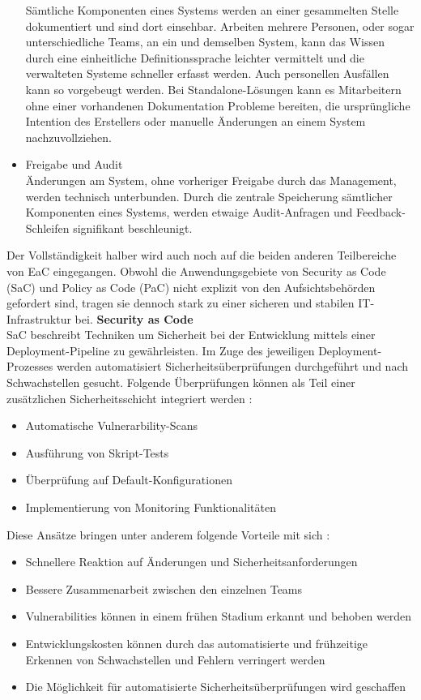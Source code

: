 \begin{itemize}
        Sämtliche Komponenten eines Systems werden an einer gesammelten Stelle dokumentiert und sind dort einsehbar. Arbeiten mehrere Personen, oder sogar unterschiedliche Teams, an ein und demselben System, kann das Wissen durch eine einheitliche Definitionssprache leichter vermittelt und die verwalteten Systeme schneller erfasst werden. Auch personellen Ausfällen kann so vorgebeugt werden. Bei Standalone-Lösungen kann es Mitarbeitern ohne einer vorhandenen Dokumentation Probleme bereiten, die ursprüngliche Intention des Erstellers oder manuelle Änderungen an einem System nachzuvollziehen.
    \item Freigabe und Audit\\
        Änderungen am System, ohne vorheriger Freigabe durch das Management, werden technisch unterbunden. Durch die zentrale Speicherung sämtlicher Komponenten eines Systems, werden etwaige Audit-Anfragen und Feedback-Schleifen signifikant beschleunigt.
\end{itemize} 
\bigbreak
Der Vollständigkeit halber wird auch noch auf die beiden anderen Teilbereiche von EaC eingegangen. Obwohl die Anwendungsgebiete von \glqq{}Security as Code\grqq{} (SaC) und \glqq{}Policy as Code\grqq{} (PaC) nicht explizit von den Aufsichtsbehörden gefordert sind, tragen sie dennoch stark zu einer sicheren und stabilen IT-Infrastruktur bei. 
\bigbreak
\textbf{Security as Code}\\
SaC beschreibt Techniken um Sicherheit bei der Entwicklung mittels einer Deployment-Pipeline zu gewährleisten. Im Zuge des jeweiligen Deployment-Prozesses werden automatisiert Sicherheitsüberprüfungen durchgeführt und nach Schwachstellen gesucht.
Folgende Überprüfungen können als Teil einer zusätzlichen Sicherheitsschicht integriert werden \autocite{hackernoon_2020}:
\begin{itemize}
    \item Automatische Vulnerarbility-Scans
    \item Ausführung von Skript-Tests
    \item Überprüfung auf Default-Konfigurationen
    \item Implementierung von Monitoring Funktionalitäten
\end{itemize}
\bigbreak
Diese Ansätze bringen unter anderem folgende Vorteile mit sich \autocite{hackernoon_2020}:
\begin{itemize}
    \item Schnellere Reaktion auf Änderungen und Sicherheitsanforderungen
    \item Bessere Zusammenarbeit zwischen den einzelnen Teams
    \item Vulnerabilities können in einem frühen Stadium erkannt und behoben werden
    \item Entwicklungskosten können durch das automatisierte und frühzeitige Erkennen von
    Schwachstellen und Fehlern verringert werden
    \item Die Möglichkeit für automatisierte Sicherheitsüberprüfungen wird geschaffen
\end{itemize}
